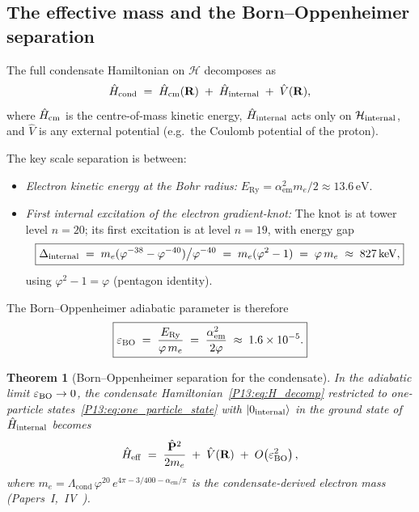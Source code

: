 \documentclass[11pt,a4paper]{article}
\newtheorem{theorem}{Theorem}[section]
\theoremstyle{definition}
\theoremstyle{remark}
\newcommand{\vp}{\varphi}
\newcommand{\Lcond}{\Lambda_{\mathrm{cond}}}
\newcommand{\ERy}{E_{\mathrm{Ry}}}
\newcommand{\aem}{\alpha_{\mathrm{em}}}
\newcommand{\eps}{\varepsilon}
\begin{document}
\subsection{The effective mass and the Born--Oppenheimer separation}
\label{P13:sec:born_oppenheimer}

The full condensate Hamiltonian on $\mathcal{H}$ decomposes as
\begin{equation}
  \hat{H}_{\rm cond}
  \;=\; \hat{H}_{\rm cm}(\mathbf{R})
  \;+\; \hat{H}_{\rm internal}
  \;+\; \hat{V}(\mathbf{R}),
  \label{P13:eq:H_decomp}
\end{equation}
where $\hat{H}_{\rm cm}$ is the centre-of-mass kinetic energy,
$\hat{H}_{\rm internal}$ acts only on $\mathcal{H}_{\rm internal}$,
and $\hat{V}$ is any external potential (e.g.\ the Coulomb potential
of the proton).

The key scale separation is between:
\begin{itemize}[noitemsep]
  \item \emph{Electron kinetic energy at the Bohr radius:}
    $\ERy = \aem^2 m_e/2 \approx 13.6\,\mathrm{eV}$.
  \item \emph{First internal excitation of the electron gradient-knot:}
    The knot is at tower level $n=20$; its first excitation is at level $n=19$,
    with energy gap
    \begin{equation}
      \boxed{\Delta_{\rm internal}
      \;=\; m_e(\vp^{-38}-\vp^{-40})\big/\vp^{-40}
      \;=\; m_e(\vp^2-1)
      \;=\; \vp\, m_e
      \;\approx\; 827\,\mathrm{keV},}
      \label{P13:eq:internal_gap}
    \end{equation}
    using $\vp^2-1=\vp$ (pentagon identity).
\end{itemize}

The Born--Oppenheimer adiabatic parameter is therefore
\begin{equation}
  \boxed{\eps_{\rm BO}
  \;=\; \frac{\ERy}{\vp\, m_e}
  \;=\; \frac{\aem^2}{2\vp}
  \;\approx\; 1.6\times10^{-5}.}
  \label{P13:eq:eps_BO}
\end{equation}

\begin{theorem}[Born--Oppenheimer separation for the condensate]
\label{P13:thm:born_oppenheimer}
In the adiabatic limit $\eps_{\rm BO}\to0$, the condensate Hamiltonian~\eqref{P13:eq:H_decomp}
restricted to one-particle states~\eqref{P13:eq:one_particle_state} with
$|0_{\rm internal}\rangle$ in the ground state of $\hat{H}_{\rm internal}$ becomes
\begin{equation}
  \hat{H}_{\rm eff}
  \;=\; \frac{\hat{\mathbf{P}}^2}{2m_e}
  \;+\; \hat{V}(\mathbf{R})
  \;+\; O\!\left(\eps_{\rm BO}^2\right),
  \label{P13:eq:Heff_BO}
\end{equation}
where $m_e = \Lcond\,\vp^{20}\,e^{4\pi-3/400-\aem/\pi}$
is the condensate-derived electron mass (Papers~I,~IV~\cite{Paper1,Paper4}).
\end{theorem}
\end{document}

